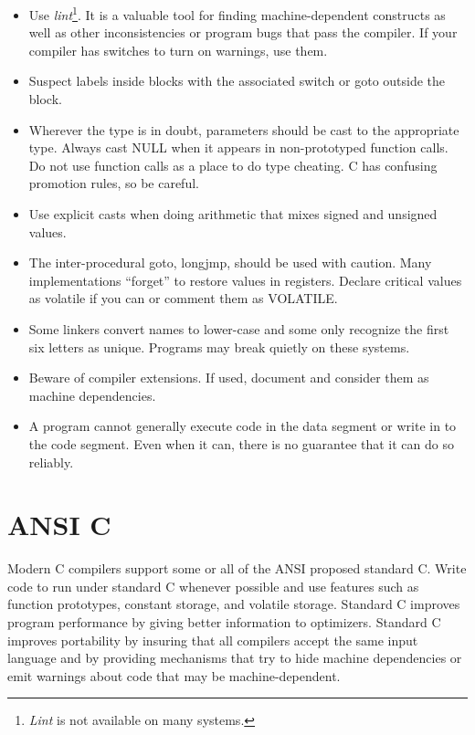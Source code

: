 \begin{itemize}
\item Use {\em lint}\/\footnote{{\em Lint} is not available on many systems.}.
It is a valuable tool for finding machine-dependent constructs as well as other
inconsistencies or program bugs that pass the compiler. If your compiler has
switches to turn on warnings, use them. 

\item Suspect labels inside blocks with the associated switch or goto outside
the block.

\item Wherever the type is in doubt, parameters should be cast to the
appropriate type. Always cast NULL when it appears in non-prototyped function
calls. Do not use function calls as a place to do type cheating. C has
confusing promotion rules, so be careful.

\item Use explicit casts when doing arithmetic that mixes signed and unsigned
values.

\item The inter-procedural goto, longjmp, should be used with caution. Many
implementations ``forget'' to restore values in registers. Declare critical
values as volatile if you can or comment them as VOLATILE.

\item Some linkers convert names to lower-case and some only recognize the first
six letters as unique. Programs may break quietly on these systems.

\item Beware of compiler extensions. If used, document and consider them as
machine dependencies. 

\item A program cannot generally execute code in the data segment or write in
to the code segment. Even when it can, there is no guarantee that it can do so
reliably. 
\end{itemize}

\section{ANSI C}
 Modern C compilers support some or all of the ANSI proposed standard C. Write
code to run under standard C whenever possible and use features such as
function prototypes, constant storage, and volatile storage. Standard C
improves program performance by giving better information to optimizers.
Standard C improves portability by insuring that all compilers accept the same
input language and by providing mechanisms that try to hide machine
dependencies or emit warnings about code that may be machine-dependent.

